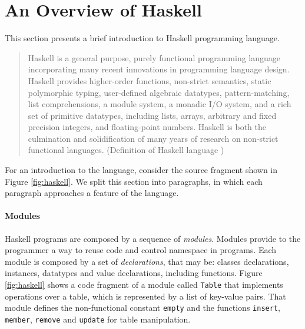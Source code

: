 \documentclass[oneside,12pt]{scrbook}
\theoremstyle{definition}
\theoremstyle{plain}
\theoremstyle{definition}
\begin{document}
\section{An Overview of Haskell}\label{section:haskell}

This section presents a brief introduction to Haskell programming language.


\begin{quote}
	Haskell is a general purpose, purely functional programming language incorporating many recent innovations in programming language design. Haskell provides higher-order functions, non-strict semantics, static polymorphic typing, user-defined algebraic datatypes, pattern-matching, list comprehensions, a module system, a monadic I/O system, and a rich set of primitive datatypes, including lists, arrays, arbitrary and fixed precision integers, and floating-point numbers. Haskell is both the culmination and solidification of many years of research on non-strict functional languages.
	 (Definition of Haskell language \cite{Haskell98})
\end{quote}

For an introduction to the language, consider the source fragment shown in Figure \ref{fig:haskell}. We split this section into paragraphs, in which each paragraph approaches a feature of the language.

\paragraph{Modules}

Haskell programs are composed by a sequence of \textit{modules}. Modules provide to the programmer a way to reuse code and control namespace in programs. Each module is composed by a set of \textit{declarations}, that may be: classes declarations, instances, datatypes and value declarations, including functions. Figure \ref{fig:haskell} shows a code fragment of a module called \texttt{Table} that implements operations over a table, which is represented by a list of key-value pairs. That module defines the non-functional constant \texttt{empty} and the functions \texttt{insert}, \texttt{member}, \texttt{remove} and \texttt{update} for table manipulation.
\end{document}
